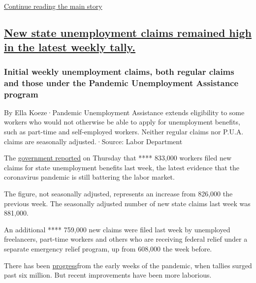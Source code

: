 \protect\hyperlink{after-dfp-ad-mid2}{Continue reading the main story}

\hypertarget{new-state-unemployment-claims-remained-high-in-the-latest-weekly-tally}{%
\subsection{\texorpdfstring{\protect\hyperlink{new-state-unemployment-claims-remained-high-in-the-latest-weekly-tally}{New
state unemployment claims remained high in the latest weekly
tally.}}{New state unemployment claims remained high in the latest weekly tally.}}\label{new-state-unemployment-claims-remained-high-in-the-latest-weekly-tally}}

\hypertarget{initial-weekly-unemployment-claims-both-regular-claims-and-those-under-the-pandemic-unemployment-assistance-program}{%
\subsubsection{Initial weekly unemployment claims, both regular claims
and those under the Pandemic Unemployment Assistance
program}\label{initial-weekly-unemployment-claims-both-regular-claims-and-those-under-the-pandemic-unemployment-assistance-program}}

By Ella Koeze·Pandemic Unemployment Assistance extends eligibility to
some workers who would not otherwise be able to apply for unemployment
benefits, such as part-time and self-employed workers. Neither regular
claims nor P.U.A. claims are seasonally adjusted.·Source: Labor
Department

The \href{https://www.dol.gov/ui/data.pdf}{government reported} on
Thursday that **** 833,000 workers filed new claims for state
unemployment benefits last week, the latest evidence that the
coronavirus pandemic is still battering the labor market.

The figure, not seasonally adjusted, represents an increase from 826,000
the previous week. The seasonally adjusted number of new state claims
last week was 881,000.

An additional **** 759,000 new claims were filed last week by unemployed
freelancers, part-time workers and others who are receiving federal
relief under a separate emergency relief program, up from 608,000 the
week before.

There has been
\href{https://fred.stlouisfed.org/series/ICNSA}{progress}from the early
weeks of the pandemic, when tallies surged past six million. But recent
improvements have been more laborious.

